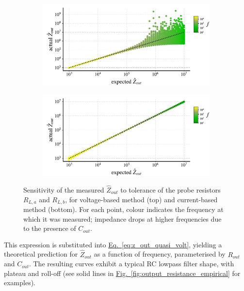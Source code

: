 \documentclass[10pt]{article}
\newcommand{\briefeqlink}[1]{\hyperref[#1]{Eq.~\ref*{#1}}\xspace }
\newcommand{\brieffiglink}[1]{\hyperref[#1]{Fig.~\ref*{#1}}}
\begin{document}
\begin{figure}[t!]

	\begin{subfigure}{\textwidth}
        \centering
		\includegraphics[scale=.6]{sensitivity_[method=voltage].pdf}
        \caption{}
        \label{fig:measurement_sensitivity_voltage}
    \end{subfigure}

	\begin{subfigure}{\textwidth}
        \centering
		\includegraphics[scale=.6]{sensitivity_[method=current].pdf}
        \caption{}
        \label{fig:measurement_sensitivity_current}
    \end{subfigure}

\caption{\small Sensitivity of the measured $\hat{Z}_{out}$ to tolerance of the probe resistors $R_{L,a}$ and $R_{L,b}$, for voltage-based method (top) and current-based method (bottom). For each point, colour indicates the frequency at which it was measured; impedance drops at higher frequencies due to the presence of $C_{out}$.}
\label{fig:measurement_sensitivity}
\end{figure}
This expression is substituted into \briefeqlink{eq:z_out_quasi_volt}, yielding a theoretical prediction for $\hat{Z}_{out}$ as a function of frequency, parameterised by $R_{out}$ and $C_{out}$. The resulting curves exhibit a typical RC lowpass filter shape, with plateau and roll-off (see solid lines in \brieffiglink{fig:output_resistance_empirical} for examples).
\end{document}
